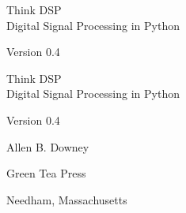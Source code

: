 \documentclass[12pt]{book}
\newcommand{\theversion}{0.4}
\begin{document}
\begin{latexonly}

\renewcommand{\blankpage}{\thispagestyle{empty} \quad \newpage}


\thispagestyle{empty}

\begin{flushright}
\vspace*{2.0in}

\begin{spacing}{3}
{\huge Think DSP}\\
{\Large Digital Signal Processing in Python}
\end{spacing}

\vspace{0.25in}

Version \theversion

\vfill

\end{flushright}


\blankpage
\blankpage

\pagebreak
\thispagestyle{empty}

\begin{flushright}
\vspace*{2.0in}

\begin{spacing}{3}
{\huge Think DSP}\\
{\Large Digital Signal Processing in Python}
\end{spacing}

\vspace{0.25in}

Version \theversion

\vspace{1in}


{\Large
Allen B. Downey\\
}


\vspace{0.5in}

{\Large Green Tea Press}

{\small Needham, Massachusetts}

\vfill

\end{flushright}


\pagebreak
\thispagestyle{empty}


\end{latexonly}
\end{document}
